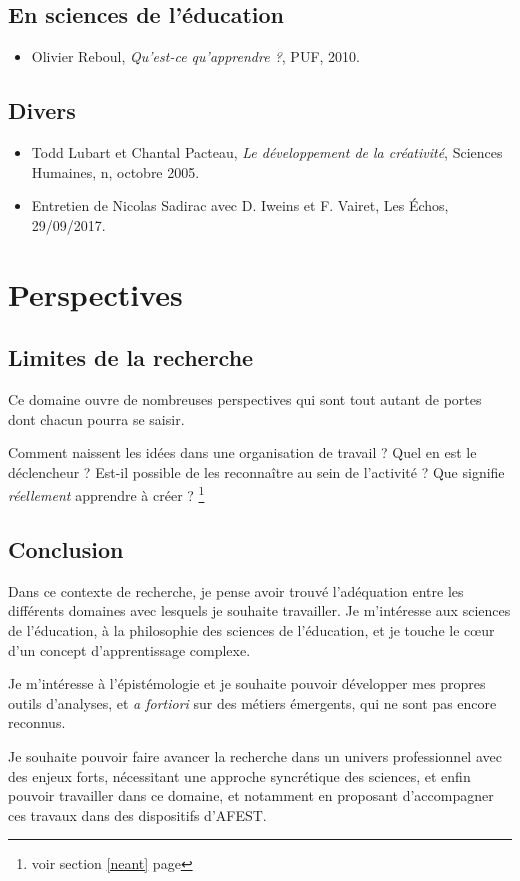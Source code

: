 \documentclass{article}
\begin{document}
\subsection{En sciences de l’éducation}

\begin{itemize}

\item Olivier Reboul, \textit{Qu'est-ce qu'apprendre ?}, PUF, 2010.

\end{itemize}

\subsection{Divers}

\begin{itemize}

\item Todd Lubart et Chantal Pacteau, \textit{Le développement de la créativité}, Sciences Humaines, n, octobre 2005.
\item Entretien de Nicolas Sadirac avec D. Iweins et F. Vairet, Les Échos, 29/09/2017.

\end{itemize}

\section{Perspectives}

\subsection{Limites de la recherche}

Ce domaine ouvre de nombreuses perspectives qui sont tout autant de portes dont chacun pourra se saisir. 

Comment naissent les idées dans une organisation de travail ? Quel en est le déclencheur ? Est-il possible de les reconnaître au sein de l'activité ? Que signifie \emph{réellement} apprendre à créer ? \footnote{voir section \ref{neant} page \pageref{neant}}

\subsection{Conclusion}

Dans ce contexte de recherche, je pense avoir trouvé l'adéquation entre les différents domaines avec lesquels je souhaite travailler. Je m'intéresse aux sciences de l'éducation, à la philosophie des sciences de l'éducation, et je touche le cœur d'un concept d'apprentissage complexe.

Je m'intéresse à l'épistémologie et je souhaite pouvoir développer mes propres outils d'analyses, et \emph{a fortiori} sur des métiers émergents, qui ne sont pas encore reconnus.

Je souhaite pouvoir faire avancer la recherche dans un univers professionnel avec des enjeux forts, nécessitant une approche syncrétique des sciences, et enfin pouvoir travailler dans ce domaine, et notamment en proposant d'accompagner ces travaux dans des dispositifs d'AFEST.
\end{document}
